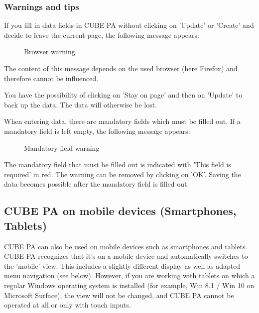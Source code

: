 \subsubsection{Warnings and tips}
If you fill in data fields in CUBE PA without clicking on 'Update' or 'Create' and decide to leave the current page, the following message appears: 

\begin{figure}[H]
\caption{Browser warning}
\end{figure}
\begin{small}
The content of this message depends on the used browser (here Firefox) and therefore cannot be influenced.
\end{small}

\vspace{\baselineskip}

You have the possibility of clicking on 'Stay on page' and then on 'Update' to back up the data. The data will otherwise be lost.

\vspace{\baselineskip}

When entering data, there are mandatory fields which must be filled out. If a mandatory field is left empty, the following message appears:

\begin{figure}[H]
\caption{Mandatory field warning}
\end{figure}

The mandatory field that must be filled out is indicated with 'This field is required' in red. The warning can be removed by clicking on 'OK'. Saving the data becomes possible after the mandatory field is filled out. 


\subsection{CUBE PA on mobile devices (Smartphones, Tablets)}

CUBE PA can also be used on mobile devices such as smartphones and tablets. CUBE PA recognizes that it's on a mobile device and automatically switches to the 'mobile' view. This includes a slightly different display as well as adapted menu navigation (see below). However, if you are working with tablets on which a regular Windows operating system is installed (for example, Win 8.1 / Win 10 on Microsoft Surface), the view will not be changed, and CUBE PA cannot be operated at all or only with touch inputs.


